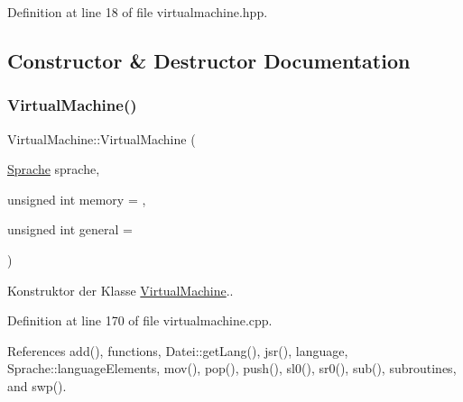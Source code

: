 Definition at line 18 of file virtualmachine.\+hpp.



\subsection{Constructor \& Destructor Documentation}
\mbox{\label{class_virtual_machine_aaaef932333f031a51e9aa16e93931edf}} 
\subsubsection{\texorpdfstring{Virtual\+Machine()}{VirtualMachine()}}
{\footnotesize\ttfamily Virtual\+Machine\+::\+Virtual\+Machine (\begin{DoxyParamCaption}\item[{\mbox{\hyperlink{class_sprache}{Sprache}}}]{sprache,  }\item[{unsigned int}]{memory = {},  }\item[{unsigned int}]{general = {} }\end{DoxyParamCaption})}

Konstruktor der Klasse \mbox{\hyperlink{class_virtual_machine}{Virtual\+Machine}}.. 

Definition at line 170 of file virtualmachine.\+cpp.



References add(), functions, Datei\+::get\+Lang(), jsr(), language, Sprache\+::language\+Elements, mov(), pop(), push(), sl0(), sr0(), sub(), subroutines, and swp().


